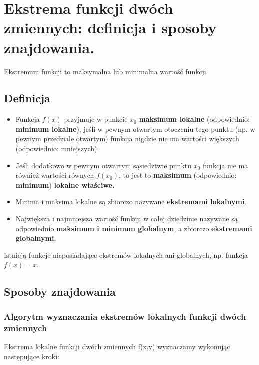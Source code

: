\section{Ekstrema funkcji dwóch zmiennych: definicja i sposoby znajdowania.}

Ekstremum funkcji to maksymalna lub minimalna wartość funkcji.

\subsection{Definicja}

\begin{itemize}[itemsep=0pt,partopsep=0pt, parsep=0pt]
    \item Funkcja $f(x)$ przyjmuje w punkcie $x_{0}$ \textbf{maksimum lokalne} (odpowiednio: \textbf{minimum lokalne}),
    jeśli w pewnym otwartym otoczeniu tego punktu (np. w pewnym przedziale otwartym)
    funkcja nigdzie nie ma wartości większych (odpowiednio: mniejszych).

    \item Jeśli dodatkowo w pewnym otwartym sąsiedztwie punktu $x_{0}$ funkcja nie ma również wartości równych $f(x_0)$,
    to jest to \textbf{maksimum} (odpowiednio: \textbf{minimum}) \textbf{lokalne właściwe.}

    \item Minima i maksima lokalne są zbiorczo nazywane \textbf{ekstremami lokalnymi}.

    \item Największa i najmniejsza wartość funkcji w całej dziedzinie nazywane są odpowiednio
    \textbf{maksimum i minimum globalnym}, a zbiorczo \textbf{ekstremami globalnymi}.
\end{itemize}

Istnieją funkcje nieposiadające ekstremów lokalnych ani globalnych, np. funkcja $f(x)=x$.

\subsection{Sposoby znajdowania}

\subsubsection{Algorytm wyznaczania ekstremów lokalnych funkcji dwóch zmiennych}

Ekstrema lokalne funkcji dwóch zmiennych f(x,y) wyznaczamy wykonując następujące kroki:

